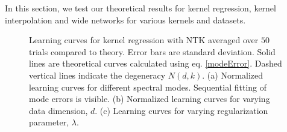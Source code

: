 \documentclass{article}
\newcommand{\cp}[1]{{\color{red} #1}}
\begin{document}
In this section, we test our theoretical results for kernel regression, kernel interpolation and wide networks for various kernels and datasets.

\begin{figure}

\caption{Learning curves for kernel regression with NTK averaged over $50$ trials compared to theory. Error bars are standard deviation. Solid lines are theoretical curves calculated using eq. \eqref{modeError}. Dashed vertical lines indicate the degeneracy $N(d,k)$. (a) Normalized learning curves for different spectral modes. Sequential fitting of mode errors is visible. (b) Normalized learning curves for varying data dimension, $d$. (c) Learning curves for varying regularization parameter, $\lambda$.}
\label{fig:kernel_expts}
\end{figure}
\end{document}
